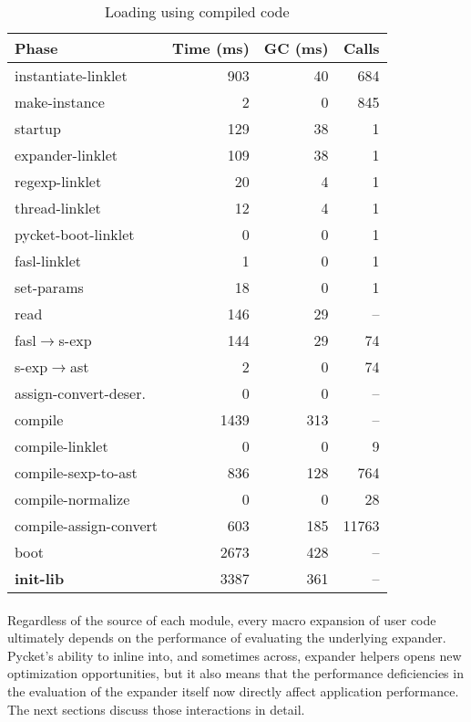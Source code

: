 		\begin{table}[!h]
		\centering
		\small
		\begin{tabular}{@{}lrrr@{}}
			\toprule
			Phase & Time (ms) & GC (ms) & Calls \\ \midrule
			instantiate-linklet            &    903 &   40 & 684 \\
			make-instance                  &      2 &    0 & 845 \\
			startup                        &    129 &   38 & 1 \\
			\quad expander-linklet         &    109 &   38 & 1 \\
			\quad regexp-linklet                 &     20 &    4 & 1 \\
			\quad thread-linklet                 &     12 &    4 & 1 \\
			\quad pycket-boot-linklet            &      0 &    0 & 1 \\
			\quad fasl-linklet             &      1 &    0 & 1 \\
			\quad set-params               &     18 &    0 & 1 \\ \midrule
			read                           &    146 &   29 & -- \\
			\quad fasl$\rightarrow$s-exp   &    144 &   29 & 74 \\
			\quad s-exp$\rightarrow$ast    &      2 &    0 & 74 \\
			\quad assign-convert-deser.    &      0 &    0 & -- \\ \midrule
			compile                        &   1439 &  313 & -- \\
			\quad compile-linklet          &      0 &    0 & 9 \\
			\quad compile-sexp-to-ast      &    836 &  128 & 764 \\
			\quad compile-normalize        &      0 &    0 & 28 \\
			\quad compile-assign-convert   &    603 &  185 & 11763 \\ \midrule
			boot                 		   &   2673 &  428 & -- \\
			\textbf{init-lib}			   &	3387 &   361 & -- \\
			\bottomrule
		\end{tabular}
		\caption{Loading  using compiled code}
		\label{table:boot-compiled}
		\end{table}

		\paragraph{}%
			Regardless of the source of each module, every macro expansion of user code ultimately depends on the performance of evaluating the underlying expander. Pycket's ability to inline into, and sometimes across, expander helpers opens new optimization opportunities, but it also means that the performance deficiencies in the evaluation of the expander itself now directly affect application performance. The next sections discuss those interactions in detail.

